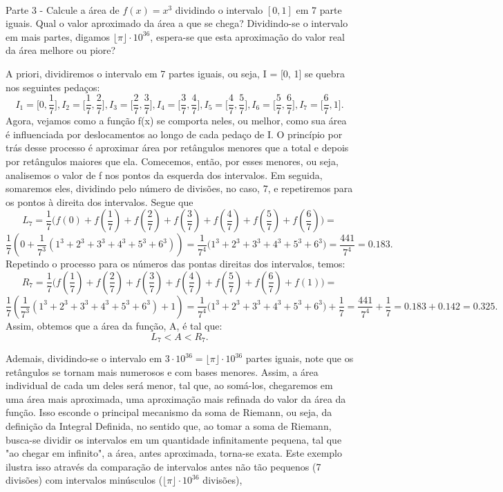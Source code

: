 \documentclass[Calculus1/exercícios_de_cálculo.tex]{subfiles}
\begin{document}
\paragraph{} Parte 3 - Calcule a área de $f(x) = x^3$ dividindo o intervalo $[0, 1]$ em 7 parte iguais. Qual o valor aproximado da área a que se chega? Dividindo-se o intervalo em mais partes, digamos $\lfloor{\pi}\rfloor\cdot{10^{36}}$, espera-se que esta aproximação do valor real da área melhore ou piore?
\begin{sol*}
	A priori, dividiremos o intervalo em 7 partes iguais, ou seja, I = [0, 1] se quebra nos seguintes pedaços:
	$$
		I_1 = \biggl[0, \frac{1}{7}\biggr],     I_2 = \biggl[\frac{1}{7}, \frac{2}{7}\biggr],       I_3 = \biggl[\frac{2}{7}, \frac{3}{7}\biggr],    I_4 = \biggl[\frac{3}{7}, \frac{4}{7}\biggr],    I_5 = \biggl[\frac{4}{7}, \frac{5}{7}\biggr], I_6 = \biggl[\frac{5}{7}, \frac{6}{7}\biggr], I_7 = \biggl[\frac{6}{7}, 1\biggr].
	$$
	Agora, vejamos como a função f(x) se comporta neles, ou melhor, como sua área é influenciada por deslocamentos ao longo de cada pedaço de I. O princípio por trás desse processo é aproximar área por retângulos menores que a total e depois por retângulos maiores que ela. Comecemos, então, por esses menores, ou seja, analisemos o valor de f nos pontos da esquerda dos intervalos. Em seguida, somaremos eles, dividindo pelo número de divisões, no caso, 7, e repetiremos para os pontos à direita dos intervalos. Segue que
	$$
		L_7 = \frac{1}{7}\biggl(f(0) + f(\frac{1}{7}) + f(\frac{2}{7}) + f(\frac{3}{7}) + f(\frac{4}{7}) + f(\frac{5}{7}) + f(\frac{6}{7})\biggr) =
	$$
	$$
		\frac{1}{7}(0 + \frac{1}{7^3}(1^3 + 2^3 + 3^3 + 4^3 + 5^3 + 6^3)) = \frac{1}{7^4}\biggl(1^3 + 2^3 + 3^3 + 4^3 + 5^3 + 6^3\biggr) = \frac{441}{7^4}
		= 0.183.$$
	Repetindo o processo para os números das pontas direitas dos intervalos, temos:
	$$
		R_7 = \frac{1}{7}\biggl(f(\frac{1}{7}) + f(\frac{2}{7}) + f(\frac{3}{7}) + f(\frac{4}{7}) + f(\frac{5}{7}) + f(\frac{6}{7}) + f(1)\biggr) =
	$$
	$$
		\frac{1}{7}(\frac{1}{7^3}(1^3 + 2^3 + 3^3 + 4^3 + 5^3 + 6^3) + 1) = \frac{1}{7^4}\biggl(1^3 + 2^3 + 3^3 + 4^3 + 5^3 + 6^3\biggr) + \frac{1}{7} = \frac{441}{7^4} + \frac{1}{7}= 0.183 + 0.142 = 0.325.
	$$
	Assim, obtemos que a área da função, A, é tal que:
	$$
		L_7 < A < R_7.
	$$
	\par{}Ademais, dividindo-se o intervalo em $3\cdot{10^{36}} = \lfloor{\pi}\rfloor\cdot{10^{36}}$ partes iguais, note que os retângulos se tornam mais numerosos e com bases menores. Assim, a área individual de cada um deles será menor, tal que, ao somá-los, chegaremos em uma área mais aproximada, uma aproximação mais refinada do valor da área da função. Isso esconde o principal mecanismo da soma de Riemann, ou seja, da definiç\~ao da Integral Definida, no sentido que, ao tomar a soma de Riemann, busca-se dividir os intervalos em um quantidade infinitamente pequena, tal que "ao chegar em infinito", a área, antes aproximada, torna-se exata. Este exemplo ilustra isso através da comparaç\~ao de intervalos antes n\~ao t\~ao pequenos (7 divisões) com intervalos minúsculos ($\lfloor{\pi}\rfloor\cdot{10}^{36}$ divisões),
	\qedsymbol
\end{sol*}
\end{document}
